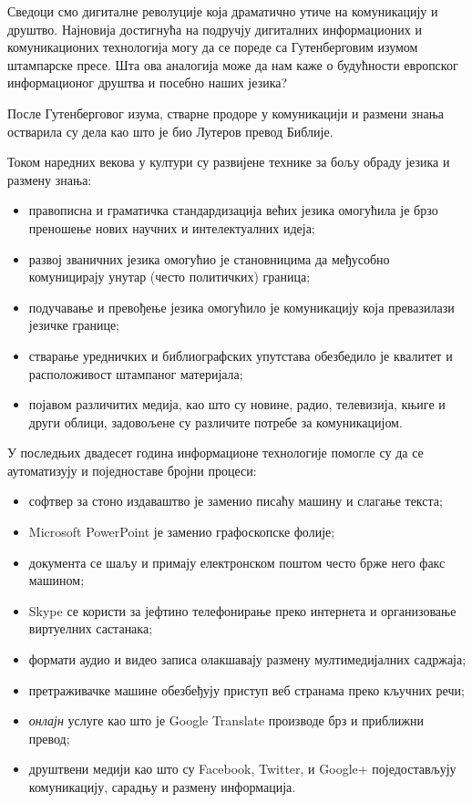 \begin{multicols}{2}


Сведоци смо дигиталне револуције која драматично утиче на комуникацију и друштво. Најновија достигнућа на подручју дигиталних информационих и комуникационих технологија могу да се пореде са Гутенберговим изумом штампарске пресе. Шта ова аналогија може да нам каже о будућности европског информационог друштва и посебно наших језика? 

После Гутенберговог изума, стварне продоре у комуникацији и размени знања остварила су дела као што је био Лутеров превод Библије. 


Током наредних векова у култури су развијене технике за бољу обраду језика и размену знања:

\begin{itemize}
 \item правописна и граматичка стандардизација већих језика омогућила је брзо преношење нових научних и интелектуалних идеја;
 \item развој званичних језика омогућио је становницима да међусобно комуницирају унутар (често политичких) граница;
 \item подучавање и превођење језика омогућило је комуникацију која превазилази језичке границе;
 \item стварање уредничких и библиографских упутстава обезбедило је квалитет и расположивост штампаног материјала;
 \item појавом различитих медија, као што су новине, радио, телевизија, књиге и други облици, задовољене су различите  потребе за комуникацијом. 
\end{itemize}

У последњих двадесет година информационе технологије помогле су да се аутоматизују и поједноставе бројни процеси:

\begin{itemize}
\item софтвер за стоно издаваштво је заменио писаћу машину и слагање текста;
\item Microsoft PowerPoint је заменио графоскопске фолије;
\item документа се шаљу и примају електронском поштом често брже него факс машином;
\item Skype се користи за јефтино телефонирање преко интернета и организовање виртуелних састанака;
\item формати аудио и видео записа олакшавају размену мултимедијалних садржаја;
\item претраживачке машине обезбеђују приступ веб странама преко кључних речи;
\item \textit{онлајн} услуге као што је Google Translate производе брз и  приближни превод;
\item друштвени медији као што су Facebook, Twitter, и Google+ поједостављују  комуникацију, сарадњу и размену информација.
\end{itemize}


\end{multicols}
